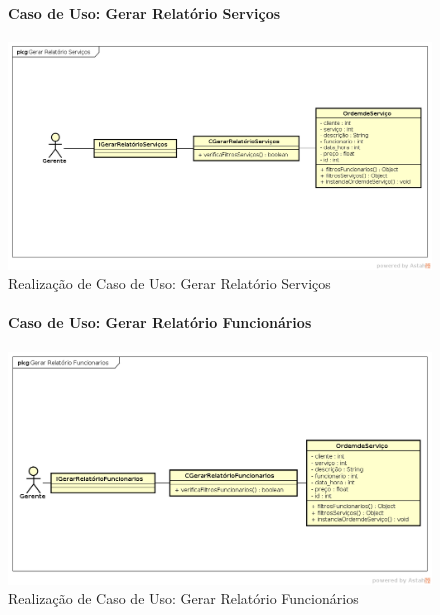 \documentclass[
	12pt,				%
	openright,
	oneside,			%
	a4paper,			%
	chapter=TITLE,		%
	brazil				%
	]{abntex2}
\begin{document}
\chapter*{}

\begin{figure}[h!]

\subsubsection*{Caso de Uso: Gerar Relatório Serviços}

	\caption{Realização de Caso de Uso: Gerar Relatório Serviços}
	\begin{center}
	    \includegraphics[scale=0.5]{Arquivos/Projeto/R_relatorio_servicos}  
	\end{center}
\end{figure}




\begin{figure}[h!]

\subsubsection*{Caso de Uso: Gerar Relatório Funcionários}

	\caption{Realização de Caso de Uso: Gerar Relatório Funcionários}
	\begin{center}
	    \includegraphics[scale=0.5]{Arquivos/Projeto/R_relatorio_funcionarios}  
	\end{center}
\end{figure}
\end{document}
